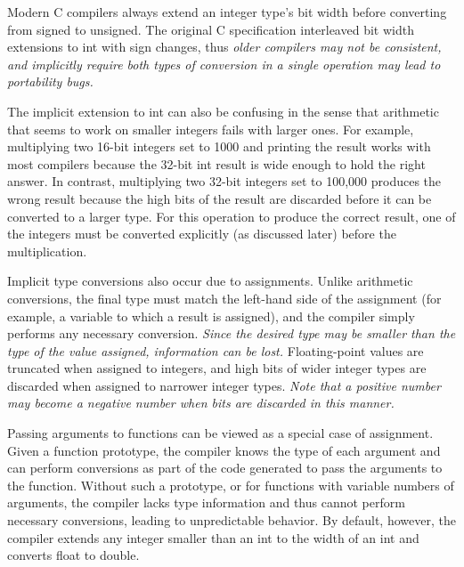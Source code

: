 Modern C compilers always extend an integer type's bit width before
converting from signed to unsigned.  The original C specification
interleaved bit width extensions to {\tfix int} with sign changes, thus
{\em older compilers may not be consistent, and implicitly require
both types of conversion in a single operation may lead to portability
bugs.}

The implicit extension to {\tfix int} can also be confusing in the sense
that arithmetic that seems to work on smaller integers fails with
larger ones.  For example, multiplying two 16-bit integers set to 1000
and printing the result works with most compilers because the 32-bit 
{\tfix int} result is wide enough to hold the right answer.  In contrast,
multiplying two 32-bit integers set to 100,000 produces the wrong
result because the high bits of the result are discarded before it can
be converted to a larger type.  For this operation to produce the
correct result, one of the integers must be converted explicitly (as
discussed later) before the multiplication.

\pagebreak

Implicit type conversions also occur due to assignments.  Unlike
arithmetic conversions, the final type must match the left-hand side
of the assignment (for example, a variable to which a result is assigned), and
the compiler simply performs any necessary conversion.
%
{\em Since the desired type may be smaller than the type of the value
assigned, information can be lost.}  Floating-point values are
truncated when assigned to integers, and high bits of wider integer
types are discarded when assigned to narrower integer types.  {\em Note
that a positive number may become a negative number when bits are
discarded in this manner.}

Passing arguments to functions can be viewed as a special case of
assignment.  Given a function prototype, the compiler knows the type
of each argument and can perform conversions as part of the code
generated to pass the arguments to the function.  Without such a
prototype, or for functions with variable numbers of arguments, the
compiler lacks type information and thus cannot perform necessary
conversions, leading to unpredictable behavior.  By default, however,
the compiler extends any integer smaller than an {\tfix int}
to the width of an {\tfix int} and converts {\tfix float} to
{\tfix double}.

